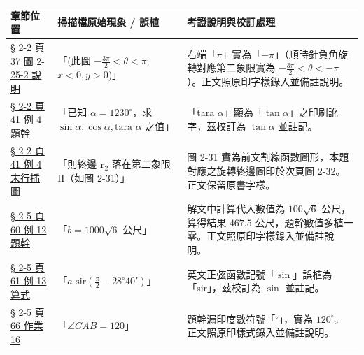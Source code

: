 \documentclass[a4paper,12pt,twoside]{article}
\begin{document}
\begin{table}[H]
\centering
\small
\renewcommand{\arraystretch}{1.35}
\begin{tabularx}{\textwidth}{|p{3.2cm}|p{3.8cm}|X|}
\hline
\textbf{章節位置} & \textbf{掃描檔原始現象 / 誤植} & \textbf{考證說明與校訂處理} \\ \hline

\hyperref[note:b3s-ch2-p37-fig2-25-2]{§ 2-2 頁 37 圖 2-25-2 說明} & 
「(此圖 $-\frac{3\pi}{2} < \theta < \pi$; $x<0, y>0$)」 & 
右端「$\pi$」實為「$-\pi$」（順時針負角旋轉對應第二象限實為 $-\frac{3\pi}{2} < \theta < -\pi$）。正文照原印字樣錄入並備註說明。 \\ \hline

\hyperref[note:b3s-ch2-p41-ex4-typo]{§ 2-2 頁 41 例 4 題幹} & 
「已知 $\alpha = 1230^\circ$，求 $\sin\alpha, \cos\alpha, \text{tara }\alpha$ 之值」 & 
「tara $\alpha$」顯為「$\tan\alpha$」之印刷訛字，茲校訂為 $\tan\alpha$ 並註記。 \\ \hline

\hyperref[note:b3s-ch2-p41-ref-fig31]{§ 2-2 頁 41 例 4 末行插圖} & 
「則終邊 $\mathbf{r}_2$ 落在第二象限 $\mathrm{II}$（如圖 2-31）」 & 
圖 2-31 實為前文割線函數圖形，本題對應之旋轉終邊圖印於次頁圖 2-32。正文保留原書字樣。 \\ \hline

\hyperref[note:b3s-ch2-p60-ex12-data]{§ 2-5 頁 60 例 12 題幹} & 
「$b = 1000\sqrt{6}$ 公尺」 & 
解文中計算代入數值為 $100\sqrt{6}$ 公尺，算得結果 $467.5$ 公尺，題幹數值多植一零。正文照原印字樣錄入並備註說明。 \\ \hline

\hyperref[note:b3s-ch2-p61-ex13-sir]{§ 2-5 頁 61 例 13 算式} & 
「$a\text{ sir}(\frac{\pi}{2} - 28^\circ 40')$」 & 
英文正弦函數記號「$\sin$」誤植為「sir」，茲校訂為 $\sin$ 並註記。 \\ \hline

\hyperref[note:b3s-ch2-p66-homework16-deg]{§ 2-5 頁 66 作業 16} & 
「$\angle CAB = 120$」 & 
題幹漏印度數符號「$^\circ$」，實為 $120^\circ$。正文照原印樣式錄入並備註說明。 \\ \hline

\end{tabularx}
\end{table}

\clearpage
\tableofcontents
\newpage

\setcounter{section}{1}

\end{document}
